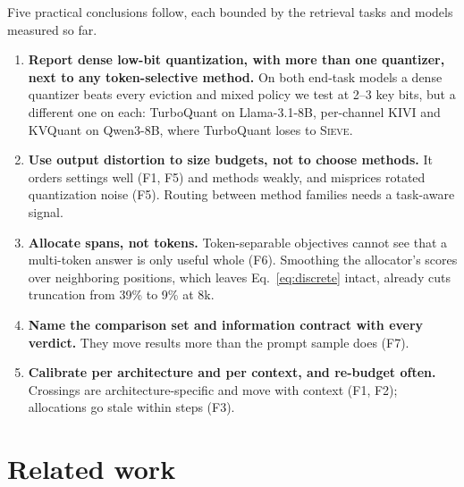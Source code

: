 \documentclass{article}
\newcommand{\sieve}{\textsc{Sieve}}
\theoremstyle{definition}
\begin{document}
Five practical conclusions follow, each bounded by the retrieval tasks and models measured so far.
\begin{enumerate}[leftmargin=*,itemsep=1pt,topsep=2pt]
  \item \textbf{Report dense low-bit quantization, with more than one quantizer, next to any token-selective method.}  On both end-task models a dense quantizer beats every eviction and mixed policy we test at 2--3 key bits, but a different one on each: TurboQuant on Llama-3.1-8B, per-channel KIVI and KVQuant on Qwen3-8B, where TurboQuant loses to \sieve{}.
  \item \textbf{Use output distortion to size budgets, not to choose methods.}  It orders settings well (F1, F5) and methods weakly, and misprices rotated quantization noise (F5).  Routing between method families needs a task-aware signal.
  \item \textbf{Allocate spans, not tokens.}  Token-separable objectives cannot see that a multi-token answer is only useful whole (F6).  Smoothing the allocator's scores over neighboring positions, which leaves Eq.~\ref{eq:discrete} intact, already cuts truncation from 39\% to 9\% at 8k.
  \item \textbf{Name the comparison set and information contract with every verdict.}  They move results more than the prompt sample does (F7).
  \item \textbf{Calibrate per architecture and per context, and re-budget often.}  Crossings are architecture-specific and move with context (F1, F2); allocations go stale within steps (F3).
\end{enumerate}


\section{Related work}
\label{sec:related}
\end{document}
